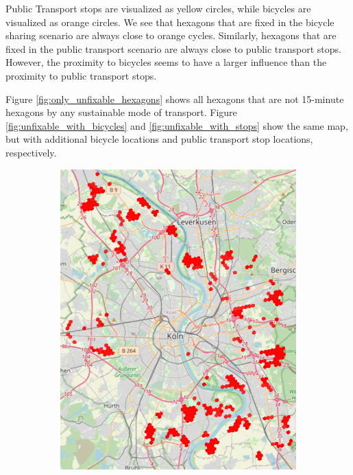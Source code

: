 Public Transport stops are visualized as yellow circles, while bicycles are visualized as orange circles.
We see that hexagons that are fixed in the bicycle sharing scenario are always close to orange cycles.
Similarly, hexagons that are fixed in the public transport scenario are always close to public transport stops.
However, the proximity to bicycles seems to have a larger influence than the proximity to public transport stops.


Figure \ref{fig:only_unfixable_hexagons} shows all hexagons that are not 15-minute hexagons by any sustainable mode of transport.
Figure \ref{fig:unfixable_with_bicycles} and \ref{fig:unfixable_with_stops} show the same map, but with additional bicycle locations and public transport stop locations, respectively.

\begin{figure}
     \centering
     \begin{subfigure}[b]{0.30\textwidth}
         \centering
         \includegraphics[width=\textwidth]{Figures/results/problematic_hexagons/unfixable.png}

\end{subfigure}
\end{figure}

